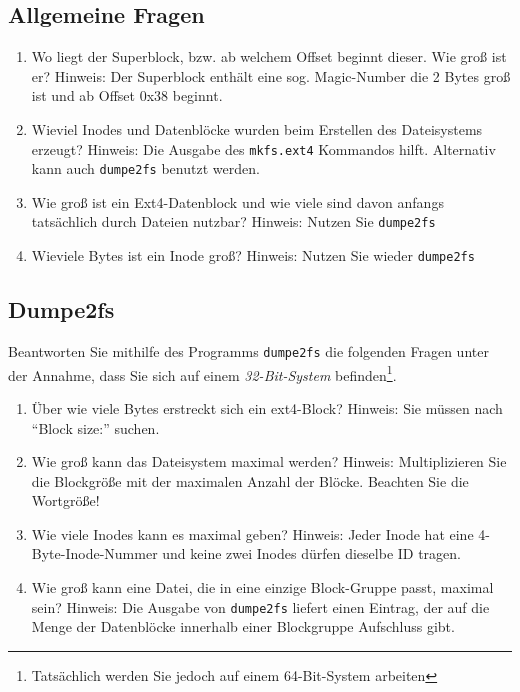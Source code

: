 \documentclass[11pt,a4paper]{article}
\def\inlinebash{\lstinline[style=bash]}
\begin{document}
\subsection{Allgemeine Fragen}
\begin{enumerate}
\item Wo liegt der Superblock, bzw. ab welchem Offset beginnt dieser.
	Wie groß ist er? Hinweis: Der Superblock enthält eine sog. Magic-Number
	die 2 Bytes groß ist und ab Offset 0x38 beginnt.
\item Wieviel Inodes und Datenblöcke wurden beim Erstellen des Dateisystems erzeugt?
	Hinweis: Die Ausgabe des \inlinebash$mkfs.ext4$ Kommandos hilft. Alternativ 
	kann auch \inlinebash$dumpe2fs$ benutzt werden.
\item Wie groß ist ein Ext4-Datenblock und wie viele sind davon anfangs
	tatsächlich durch Dateien nutzbar? Hinweis: Nutzen Sie \inlinebash$dumpe2fs$
\item Wieviele Bytes ist ein Inode groß? Hinweis: Nutzen Sie wieder \inlinebash$dumpe2fs$

\end{enumerate}

\subsection{Dumpe2fs}
	Beantworten Sie mithilfe des Programms \inlinebash$dumpe2fs$ 
	die folgenden Fragen unter der Annahme,
	dass Sie sich auf einem \emph{32-Bit-System} 
	befinden\footnote{Tatsächlich werden Sie jedoch auf 
		einem 64-Bit-System arbeiten}.
	\begin{enumerate}
		\item Über wie viele Bytes erstreckt sich ein ext4-Block?
			Hinweis: Sie müssen nach ``Block size:'' suchen.
		\item Wie groß kann das Dateisystem maximal werden? 
			Hinweis: Multiplizieren Sie die Blockgröße 
			mit der maximalen Anzahl der Blöcke. Beachten Sie die Wortgröße!
		\item Wie viele Inodes kann es maximal geben? Hinweis: 
			Jeder Inode hat eine 4-Byte-Inode-Nummer und keine zwei Inodes
			dürfen dieselbe ID tragen.
		\item Wie groß kann eine Datei, die in eine einzige Block-Gruppe passt,
			maximal sein? Hinweis: Die Ausgabe von \inlinebash$dumpe2fs$ liefert
			einen Eintrag, der auf die Menge der Datenblöcke innerhalb einer
			Blockgruppe Aufschluss gibt.
	\end{enumerate}
\end{document}
